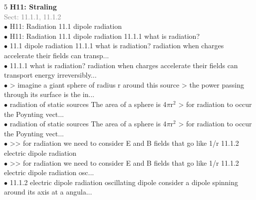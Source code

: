 \documentclass[7pt,a4paper]{article}
\begin{document}
\begin{multicols*}{5}
\textbf{H11: Straling}\\\textcolor{gray}{{Sect: 11.1.1, 11.1.2}}\\\vspace{0.5pt}
$\bullet$ H11: Radiation 
11.1 dipole radiation\\
$\bullet$ H11: Radiation 
11.1 dipole radiation 
11.1.1 what is radiation?\\
$\bullet$ 11.1 dipole radiation 
11.1.1 what is radiation? 
radiation when charges accelerate their fields can transp...\\
$\bullet$ 11.1.1 what is radiation? 
radiation when charges accelerate their fields can transport energy irreversibly...\\
$\bullet$ > imagine a giant sphere of radius r around this source 
 > the power passing through its surface is the in...\\
$\bullet$ radiation of static sources The area of a sphere is 4$\pi$r$^2$ 
> for radiation to occur the Poynting vect...\\
$\bullet$ radiation of static sources The area of a sphere is 4$\pi$r$^2$ 
> for radiation to occur the Poynting vect...\\
$\bullet$ >> for radiation we need to consider E and B fields that go like 1/r 
11.1.2 electric dipole radiation\\
$\bullet$ >> for radiation we need to consider E and B fields that go like 1/r 
11.1.2 electric dipole radiation 
osc...\\
$\bullet$ 11.1.2 electric dipole radiation 
oscillating dipole consider a dipole spinning around its axis at a angula...\\
\columnbreak


\end{multicols*}
\end{document}
